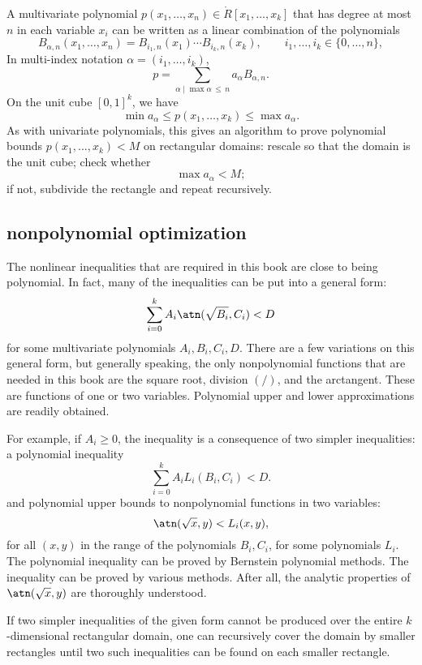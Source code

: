 A multivariate polynomial $p(x_1,\ldots,x_n)\in \ring{R}[x_1,\ldots,x_k]$ that
has degree at most $n$ in each variable $x_i$ can be written as a linear
combination of the polynomials
\[
B_{\alpha,n}(x_1,\ldots,x_n)=B_{i_1,n}(x_1)\cdots B_{i_k,n}(x_k),\qquad
 i_1,\ldots,i_k\in \{0,\ldots,n\},
\]
In multi-index notation $\alpha=(i_1,\ldots,i_k)$, 
\[
p = \sum_{\alpha\mid \max{\alpha}\,\le\, n} a_\alpha B_{\alpha,n}.
\]
On the unit cube $[0,1]^k$, we have
\[
\min a_\alpha \le p(x_1,\ldots,x_k) \le \max a_\alpha.
\]
As with univariate polynomials, this gives an algorithm to prove
polynomial bounds $p(x_1,\ldots,x_k)<M$ on rectangular domains:
rescale so that the domain is the unit cube; check whether
\[
\max a_\alpha < M;
\]
if not, subdivide the rectangle and repeat recursively.



\subsection{nonpolynomial optimization}

The nonlinear inequalities that are required in this book are close to
being polynomial.  In fact, many  of the inequalities can be put into a
general form:
\begin{equation}\label{eqn:ABCD}
\sum_{i=0}^k A_i \atn(\sqrt{B_i},C_i) < D
\end{equation}
for some multivariate polynomials $A_i,B_i,C_i,D$.  There are a few
variations on this general form, but generally speaking, the only
nonpolynomial functions that are needed in this book are the square
root, division $(/)$, and the arctangent.  These
are functions of one or two variables.  Polynomial upper and lower
approximations are readily obtained.

For example, if $A_i\ge 0$, the inequality  is a
consequence of two simpler inequalities: a polynomial inequality
\[
\sum_{i=0}^k A_i L_i(B_i,C_i) < D.
\]
and polynomial upper bounds to nonpolynomial functions in two variables:
\begin{equation}\label{eqn:sL}
\atn(\sqrt{x},y) < L_i(x,y),
\end{equation}
for all $(x,y)$ in the range of the polynomials $B_i,C_i$, for some
polynomials $L_i$.  The polynomial
inequality can be proved by Bernstein polynomial methods.  The
inequality  can be proved by various methods.  After all,
the analytic properties of $\atn(\sqrt{x},y)$ are thoroughly
understood.

If two simpler inequalities of the given form cannot be produced over
the entire $k$-dimensional rectangular domain, one can recursively
cover the domain by smaller rectangles until two such inequalities can
be found on each smaller rectangle.


